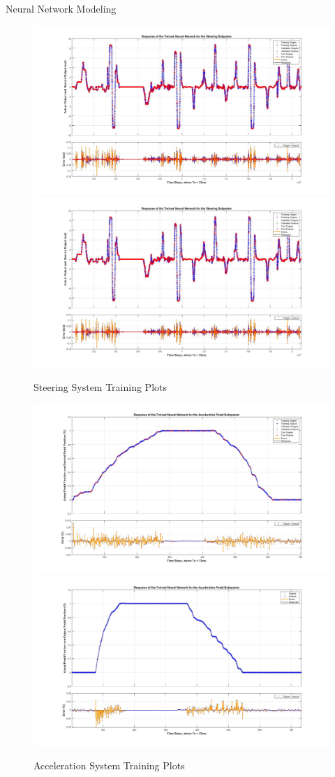 \documentclass[final]{beamer}
\newlength{\onecolwid}
\begin{document}
\begin{frame}[t]
\begin{columns}[t]
\begin{column}{\onecolwid}
\begin{alertblock}{Neural Network Modeling}
\begin{figure}
    \centering
		{\includegraphics[width=0.48\linewidth]{figs/img/steeringNeuralNetworkTrainedOutput}}
		{\includegraphics[width=0.48\linewidth]{figs/img/steeringNeuralNetworkTrainedOutput}}
	\caption{Steering System Training Plots}
    \label{fig:SteeringSysNeuralNetwork}
\end{figure}

\begin{figure}
    \centering
		{\includegraphics[width=0.48\linewidth]{figs/img/accelNeuralNetworkTrainedOutput}}
		{\includegraphics[width=0.48\linewidth]{figs/img/accelNeuralNetworkTrainedOutput2}}
	\caption{Acceleration System Training Plots}
    \label{fig:AccelerationSysNeuralNetwork}
\end{figure}


\end{alertblock}
\end{column}
\end{columns}
\end{frame}
\end{document}

